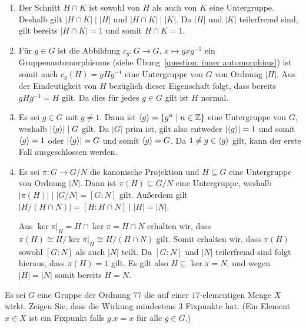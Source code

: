 \begin{solution}
  \begin{enumerate}
    \item
      Der Schnitt $H \cap K$ ist sowohl von $H$ als auch von $K$ eine Untergruppe.
      Deshalb gilt $|H \cap K| \mid |H|$ und $|H \cap K| \mid |K|$.
      Da $|H|$ und $|K|$ teilerfremd sind, gilt bereits $|H \cap K| = 1$ und somit $H \cap K = 1$.
      
    \item
      Für $g \in G$ ist die Abbildung $c_g \colon G \to G$, $x \mapsto gxg^{-1}$ ein Gruppenautomorphismus (siehe Übung~\ref{question: inner automorphims}) ist somit auch $c_g(H) = gHg^{-1}$ eine Untergruppe von $G$ von Ordnung $|H|$.
      Aus der Eindeutigkeit von $H$ bezüglich dieser Eigenschaft folgt, dass bereits $g H g^{-1} = H$ gilt.
      Da dies für jedes $g \in G$ gilt ist $H$ normal.
    
    \item
      Es sei $g \in G$ mit $g \neq 1$.
      Dann ist $\left\langle g \right\rangle = \{g^n \mid n \in \mathbb{Z}\}$ eine Untergruppe von $G$, weshalb $|{\left\langle g \right\rangle}| \mid G$ gilt.
      Da $|G|$ prim ist, gilt also entweder $|{\left\langle g \right\rangle}| = 1$ und somit $\left\langle g \right\rangle = 1$ oder $|{\left\langle g \right\rangle}| = G$ und somit $\left\langle g \right\rangle = G$.
      Da $1 \neq g \in \left\langle g \right\rangle$ gilt, kann der erste Fall ausgeschlossen werden.
    
    \item
      Es sei $\pi \colon G \to G/N$ die kanonische Projektion und $H \subseteq G$ eine Untergruppe von Ordnung $|N|$.
      Dann ist $\pi(H) \subseteq G/N$ eine Untergruppe, weshalb $|\pi(H)| \mid |G/N| = [G : N]$ gilt.
      Außerdem gilt $|H/(H \cap N)| = [H : H \cap N] \mid |H| = |N|$.
      
      Aus $\ker \pi|_H = H \cap \ker \pi = H \cap N$ erhalten wir, dass $\pi(H) \cong H / \ker \pi|_H \cong H / (H \cap N)$ gilt.
      Somit erhalten wir, dass $\pi(H)$ sowohl $[G : N]$ als auch $|N|$ teilt.
      Da $[G : N]$ und $|N|$ teilerfremd sind folgt hieraus, dass $\pi(H) = 1$ gilt.
      Es gilt also $H \subseteq \ker \pi = N$, und wegen $|H| = |N|$ somit bereits $H = N$.
  \end{enumerate}
\end{solution}


\begin{question}[subtitle = Bahnenkombinatorik]
  Es sei $G$ eine Gruppe der Ordnung $77$ die auf einer $17$-elementigen Menge $X$ wirkt.
  Zeigen Sie, dass die Wirkung mindestens $3$ Fixpunkte hat.
  (Ein Element $x \in X$ ist ein Fixpunkt falls $g.x = x$ für alle $g \in G$.)
\end{question}


